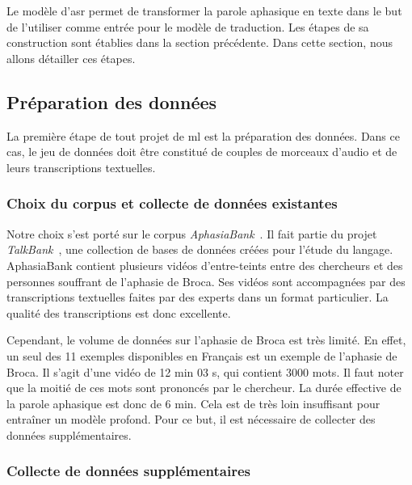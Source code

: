 \section{}

Le modèle d'\gls{asr} permet de transformer la parole aphasique en texte
dans le but de l'utiliser comme entrée pour le modèle de traduction.
Les étapes de sa construction sont établies dans la section précédente.
Dans cette section, nous allons détailler ces étapes.

\subsection{Préparation des données}

La première étape de tout projet de \gls{ml} est la préparation des données.
Dans ce cas, le jeu de données doit être constitué de couples de morceaux d'audio et de leurs transcriptions textuelles.

\subsubsection{Choix du corpus et collecte de données existantes}

Notre choix s'est porté sur le corpus \textit{AphasiaBank}~\cite{MacWhinney_Fromm_Forbes_Holland_2011}.
Il fait partie du projet \textit{TalkBank}~\cite{macwhinney2007talkbank},
une collection de bases de données créées pour l'étude du langage.
AphasiaBank contient plusieurs vidéos d'entre-teints entre des chercheurs 
et des personnes souffrant de l'aphasie de Broca.
Ses vidéos sont accompagnées par des transcriptions textuelles faites par des experts dans un format particulier.
La qualité des transcriptions est donc excellente.

Cependant, le volume de données sur l'aphasie de Broca est très limité.
En effet, un seul des 11 exemples disponibles en Français est un exemple de l'aphasie de Broca.
Il s'agit d'une vidéo de 12 min 03 s, qui contient 3000 mots.
Il faut noter que la moitié de ces mots sont prononcés par le chercheur.
La durée effective de la parole aphasique est donc de 6 min.
Cela est de très loin insuffisant pour entraîner un modèle profond.
Pour ce but, il est nécessaire de collecter des données supplémentaires. 

\subsubsection{Collecte de données supplémentaires}

